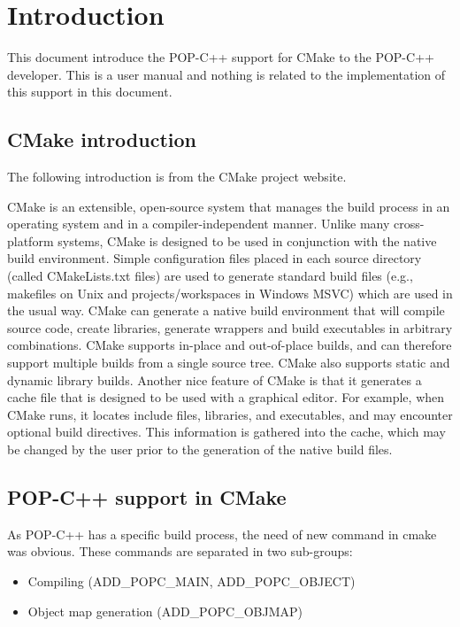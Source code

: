 \documentclass[a4paper, 11pt]{article}
\newcommand{\s}{\vspace{0.3cm}}
\begin{document}




\tableofcontents
\pagebreak
\section{Introduction}
This document introduce the POP-C++ support for CMake to the POP-C++ developer. This is a user manual and nothing is related to the implementation of this support in this document. 
\subsection{CMake introduction}
The following introduction is from the CMake project website\cite{cmake}.\s

CMake is an extensible, open-source system that manages the build process in an operating system and in a compiler-independent manner. Unlike many cross-platform systems, CMake is designed to be used in conjunction with the native build environment. Simple configuration files placed in each source directory (called CMakeLists.txt files) are used to generate standard build files (e.g., makefiles on Unix and projects/workspaces in Windows MSVC) which are used in the usual way. CMake can generate a native build environment that will compile source code, create libraries, generate wrappers and build executables in arbitrary combinations. CMake supports in-place and out-of-place builds, and can therefore support multiple builds from a single source tree. CMake also supports static and dynamic library builds. Another nice feature of CMake is that it generates a cache file that is designed to be used with a graphical editor. For example, when CMake runs, it locates include files, libraries, and executables, and may encounter optional build directives. This information is gathered into the cache, which may be changed by the user prior to the generation of the native build files.

\subsection{POP-C++ support in CMake}
As POP-C++ has a specific build process, the need of new command in cmake was obvious. These commands are separated in two sub-groups: 

\begin{itemize}
\item Compiling (ADD\_POPC\_MAIN, ADD\_POPC\_OBJECT)
\item Object map generation (ADD\_POPC\_OBJMAP)
\end{itemize}
\end{document}
